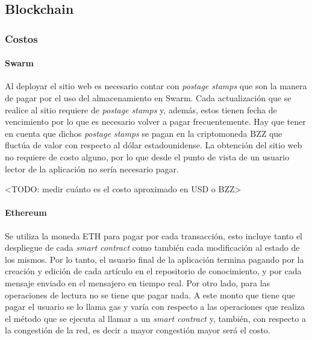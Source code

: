 \subsection{Blockchain}

\subsubsection{Costos}

\paragraph{Swarm}
Al deployar el sitio web es necesario contar con \textit{postage stamps} que son la manera de pagar por el uso del almacenamiento en Swarm. Cada actualización que se realice al sitio requiere de \textit{postage stamps} y, además, estos tienen fecha de vencimiento por lo que es necesario volver a pagar frecuentemente. Hay que tener en cuenta que dichos \textit{postage stamps} se pagan en la criptomoneda BZZ que fluctúa de valor con respecto al dólar estadounidense. La obtención del sitio web no requiere de costo alguno, por lo que desde el punto de vista de un usuario lector de la aplicación no sería necesario pagar.

<TODO: medir cuánto es el costo aproximado en USD o BZZ>

\paragraph{Ethereum}
Se utiliza la moneda ETH para pagar por cada transacción, esto incluye tanto el despliegue de cada \textit{smart contract} como también cada modificación al estado de los mismos. Por lo tanto, el usuario final de la aplicación termina pagando por la creación y edición de cada artículo en el repositorio de conocimiento, y por cada mensaje enviado en el mensajero en tiempo real. Por otro lado, para las operaciones de lectura no se tiene que pagar nada. A este monto que tiene que pagar el usuario se lo llama gas y varía con respecto a las operaciones que realiza el método que se ejecuta al llamar a un \textit{smart contract} y, también, con respecto a la congestión de la red, es decir a mayor congestión mayor será el costo.

